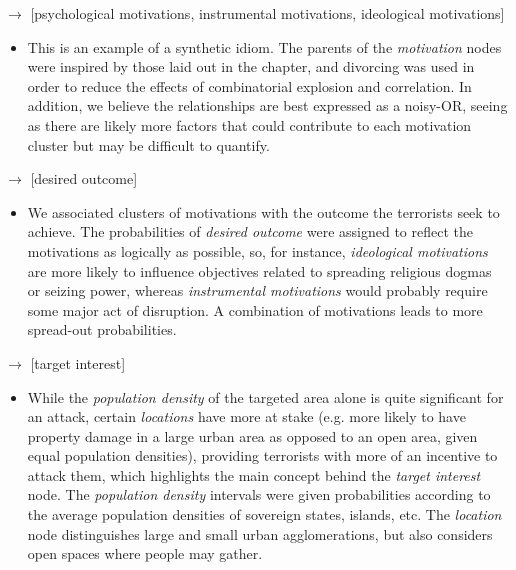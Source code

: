 \documentclass{article}
\begin{document}
{ $\longrightarrow$ [psychological motivations, instrumental motivations, ideological motivations] 
\begin{itemize}
    \item   This is an example of a synthetic idiom. The parents of the \textit{motivation} nodes were inspired by those laid out in the chapter\cite{bostromGlobalCatastrophicRisks2011}, and divorcing was used in order to reduce the effects of combinatorial explosion and correlation. In addition, we believe the relationships are best expressed as a noisy-OR, seeing as there are likely more factors that could contribute to each motivation cluster but may be difficult to quantify.  
\end{itemize}

 $\longrightarrow$ [desired outcome] 
\begin{itemize}
    \item   We associated clusters of motivations with the outcome the terrorists seek to achieve. The probabilities of \textit{desired outcome} were assigned to reflect the motivations as logically as possible, so, for instance, \textit{ideological motivations} are more likely to influence objectives related to spreading religious dogmas or seizing power, whereas \textit{instrumental motivations} would probably require some major act of disruption. A combination of motivations leads to more spread-out probabilities.   
\end{itemize}

 $\longrightarrow$ [target interest]
\begin{itemize}
    \item      While the \textit{population density} of the targeted area alone is quite significant for an attack, certain \textit{locations} have more at stake (e.g. more likely to have property damage in a large urban area as opposed to an open area, given equal population densities), providing terrorists with more of an incentive to attack them, which highlights the main concept behind the \textit{target interest} node. The \textit{population density} intervals were given probabilities according to the average population densities of sovereign states, islands, etc. The \textit{location} node distinguishes large and small urban agglomerations, but also considers open spaces where people may gather.  
\end{itemize} 

}
\end{document}
